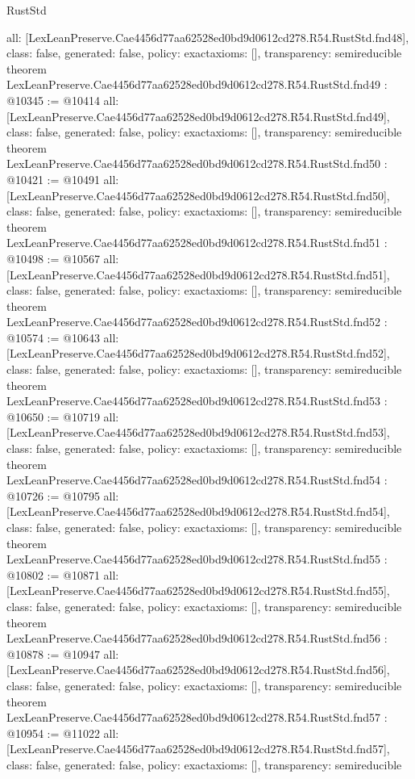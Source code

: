 \begin{lexlean}{RustStd}
\begin{coremodule}
{  all: [LexLeanPreserve.Cae4456d77aa62528ed0bd9d0612cd278.R54.RustStd.fnd48],
  class: false,
  generated: false,
  policy: exact{axioms: []},
  transparency: semireducible
}
theorem LexLeanPreserve.Cae4456d77aa62528ed0bd9d0612cd278.R54.RustStd.fnd49 : @10345 := @10414 {
  all: [LexLeanPreserve.Cae4456d77aa62528ed0bd9d0612cd278.R54.RustStd.fnd49],
  class: false,
  generated: false,
  policy: exact{axioms: []},
  transparency: semireducible
}
theorem LexLeanPreserve.Cae4456d77aa62528ed0bd9d0612cd278.R54.RustStd.fnd50 : @10421 := @10491 {
  all: [LexLeanPreserve.Cae4456d77aa62528ed0bd9d0612cd278.R54.RustStd.fnd50],
  class: false,
  generated: false,
  policy: exact{axioms: []},
  transparency: semireducible
}
theorem LexLeanPreserve.Cae4456d77aa62528ed0bd9d0612cd278.R54.RustStd.fnd51 : @10498 := @10567 {
  all: [LexLeanPreserve.Cae4456d77aa62528ed0bd9d0612cd278.R54.RustStd.fnd51],
  class: false,
  generated: false,
  policy: exact{axioms: []},
  transparency: semireducible
}
theorem LexLeanPreserve.Cae4456d77aa62528ed0bd9d0612cd278.R54.RustStd.fnd52 : @10574 := @10643 {
  all: [LexLeanPreserve.Cae4456d77aa62528ed0bd9d0612cd278.R54.RustStd.fnd52],
  class: false,
  generated: false,
  policy: exact{axioms: []},
  transparency: semireducible
}
theorem LexLeanPreserve.Cae4456d77aa62528ed0bd9d0612cd278.R54.RustStd.fnd53 : @10650 := @10719 {
  all: [LexLeanPreserve.Cae4456d77aa62528ed0bd9d0612cd278.R54.RustStd.fnd53],
  class: false,
  generated: false,
  policy: exact{axioms: []},
  transparency: semireducible
}
theorem LexLeanPreserve.Cae4456d77aa62528ed0bd9d0612cd278.R54.RustStd.fnd54 : @10726 := @10795 {
  all: [LexLeanPreserve.Cae4456d77aa62528ed0bd9d0612cd278.R54.RustStd.fnd54],
  class: false,
  generated: false,
  policy: exact{axioms: []},
  transparency: semireducible
}
theorem LexLeanPreserve.Cae4456d77aa62528ed0bd9d0612cd278.R54.RustStd.fnd55 : @10802 := @10871 {
  all: [LexLeanPreserve.Cae4456d77aa62528ed0bd9d0612cd278.R54.RustStd.fnd55],
  class: false,
  generated: false,
  policy: exact{axioms: []},
  transparency: semireducible
}
theorem LexLeanPreserve.Cae4456d77aa62528ed0bd9d0612cd278.R54.RustStd.fnd56 : @10878 := @10947 {
  all: [LexLeanPreserve.Cae4456d77aa62528ed0bd9d0612cd278.R54.RustStd.fnd56],
  class: false,
  generated: false,
  policy: exact{axioms: []},
  transparency: semireducible
}
theorem LexLeanPreserve.Cae4456d77aa62528ed0bd9d0612cd278.R54.RustStd.fnd57 : @10954 := @11022 {
  all: [LexLeanPreserve.Cae4456d77aa62528ed0bd9d0612cd278.R54.RustStd.fnd57],
  class: false,
  generated: false,
  policy: exact{axioms: []},
  transparency: semireducible
}
\end{coremodule}
\end{lexlean}
